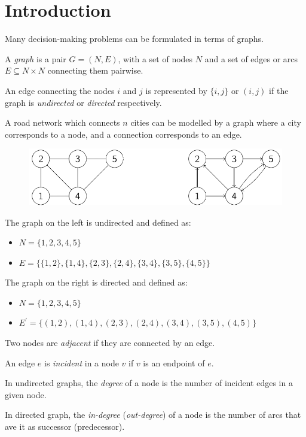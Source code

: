 \documentclass[12pt, a4paper]{report}
\newtheorem[style=M,bodystyle=\normalfont]{theorem}{Theorem}
\newtheorem[style=M,bodystyle=\normalfont]{corollary}{Corollary}
\newtheorem[style=M,bodystyle=\normalfont]{lemma}{Lemma}
\newtheorem[style=M,bodystyle=\normalfont]{definition}{Definition}
\begin{document}
    \section{Introduction}
    Many decision-making problems can be formulated in terms of graphs.
    \begin{definition}
        A \emph{graph} is a pair $G=(N,E)$, with a set of nodes $N$ and a set of edges or arcs $E \subseteq N \times N$ connecting them pairwise. 

        An edge connecting the nodes $i$ and $j$ is represented by $\{i,j\}$ or $(i,j)$ if the graph is \emph{undirected} or \emph{directed} respectively. 
    \end{definition}
    \begin{example}
        A road network which connects $n$ cities can be modelled by a graph where a city corresponds to a node, and a connection corresponds to an edge. 
        \begin{figure}[H]
            \centering
            \includegraphics[width=0.75\linewidth]{images/graph.png}
        \end{figure}
        The graph on the left is undirected and defined as: 
        \begin{itemize}
            \item $N=\{1,2,3,4,5\}$
            \item $E=\{\{1,2\},\{1,4\},\{2,3\},\{2,4\},\{3,4\},\{3,5\},\{4,5\}\}$
        \end{itemize}
        The graph on the right is directed and defined as: 
        \begin{itemize}
            \item $N=\{1,2,3,4,5\}$
            \item $E^{'}=\{(1,2),(1,4),(2,3),(2,4),(3,4),(3,5),(4,5)\}$
        \end{itemize}
    \end{example}
    \begin{definition}
        Two nodes are \emph{adjacent} if they are connected by an edge. 
        
        An edge $e$ is \emph{incident} in a node $v$ if $v$ is an endpoint of $e$. 
        
        In undirected graphs, the \emph{degree} of a node is the number of incident edges in a given node. 
        
        In directed graph, the \emph{in-degree} (\emph{out-degree}) of a node is the number of arcs that ave it as successor (predecessor).
    \end{definition}
\end{document}
